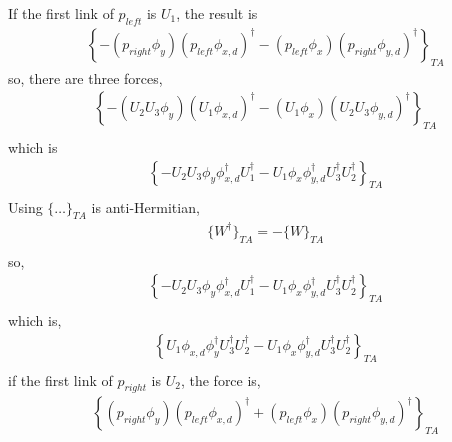 \begin{tcolorbox}
If the first link of $p_{left}$ is $U_1$, the result is
\begin{equation}
\begin{split}
&\left\{-\left(p_{right}\phi_{y}\right)\left(p_{left}\phi_{x,d}\right)^{\dagger}-\left(p_{left}\phi_{x}\right)\left(p_{right}\phi_{y,d}\right)^{\dagger}\right\}_{TA}
\end{split}
\end{equation}
so, there are three forces,
\begin{equation}
\begin{split}
&\left\{-\left(U_2U_3\phi_{y}\right)\left(U_1\phi_{x,d}\right)^{\dagger}-\left(U_1\phi_{x}\right)\left(U_2U_3\phi_{y,d}\right)^{\dagger}\right\}_{TA}\\
\end{split}
\end{equation}
which is
\begin{equation}
\begin{split}
&\left\{-U_2U_3\phi_{y}\phi_{x,d}^{\dagger}U_1^{\dagger}-U_1\phi_{x}\phi_{y,d}^{\dagger}U_3^{\dagger}U_2^{\dagger}\right\}_{TA}\\
\end{split}
\end{equation}
Using $\{\ldots\}_{TA}$ is anti-Hermitian,
\begin{equation}
\begin{split}
&\{W^{\dagger}\}_{TA}=-\{W\}_{TA}\\
\end{split}
\end{equation}
so,
\begin{equation}
\begin{split}
&\left\{-U_2U_3\phi_{y}\phi_{x,d}^{\dagger}U_1^{\dagger}-U_1\phi_{x}\phi_{y,d}^{\dagger}U_3^{\dagger}U_2^{\dagger}\right\}_{TA}\\
\end{split}
\end{equation}
which is,
\begin{equation}
\begin{split}
&\left\{U_1\phi_{x,d}\phi_{y}^{\dagger}U_3^{\dagger}U_2^{\dagger}-U_1\phi_{x}\phi_{y,d}^{\dagger}U_3^{\dagger}U_2^{\dagger}\right\}_{TA}\\
\end{split}
\end{equation}
if the first link of $p_{right}$ is $U_2$, the force is,
\begin{equation}
\begin{split}
&\left\{\left(p_{right}\phi_{y}\right)\left(p_{left}\phi_{x,d}\right)^{\dagger}+\left(p_{left}\phi_{x}\right)\left(p_{right}\phi_{y,d}\right)^{\dagger}\right\}_{TA}

\end{split}
\end{equation}
\end{tcolorbox}
